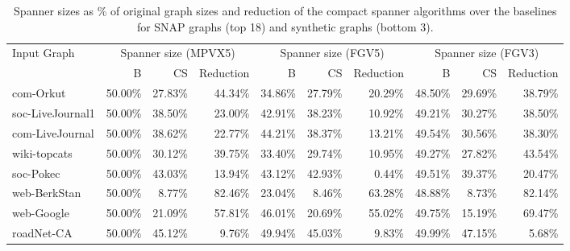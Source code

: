 \begin{table}[t]
\centering\small
\begin{tabular}{l||rrr|rrr|rrr}
\hline
Input Graph & \multicolumn{3}{c|}{Spanner size (MPVX5)} & \multicolumn{3}{c|}{Spanner size (FGV5)} & \multicolumn{3}{c}{Spanner size (FGV3)}\\
 & B & CS & Reduction & B & CS & Reduction & B & CS & Reduction \\ \hline
com-Orkut & 50.00\% & 27.83\% & 44.34\% & 34.86\% & 27.79\% & 20.29\% & 48.50\% & 29.69\% & 38.79\% \\
soc-LiveJournal1 & 50.00\% & 38.50\% & 23.00\% & 42.91\% & 38.23\% & 10.92\% & 49.21\% & 30.27\% & 38.50\% \\
com-LiveJournal & 50.00\% & 38.62\% & 22.77\% & 44.21\% & 38.37\% & 13.21\% & 49.54\% & 30.56\% & 38.30\% \\
wiki-topcats & 50.00\% & 30.12\% & 39.75\% & 33.40\% & 29.74\% & 10.95\% & 49.27\% & 27.82\% & 43.54\% \\
soc-Pokec & 50.00\% & 43.03\% & 13.94\% & 43.12\% & 42.93\% & 0.44\% & 49.51\% & 39.37\% & 20.47\% \\
web-BerkStan & 50.00\% & 8.77\% & 82.46\% & 23.04\% & 8.46\% & 63.28\% & 48.88\% & 8.73\% & 82.14\% \\
web-Google & 50.00\% & 21.09\% & 57.81\% & 46.01\% & 20.69\% & 55.02\% & 49.75\% & 15.19\% & 69.47\% \\
roadNet-CA & 50.00\% & 45.12\% & 9.76\% & 49.94\% & 45.03\% & 9.83\% & 49.99\% & 47.15\% & 5.68\% \\
\hline
\end{tabular}
\caption{Spanner sizes as \% of original graph sizes and reduction of the compact spanner algorithms over the baselines for SNAP graphs (top 18) and synthetic graphs (bottom 3).}
\end{table}